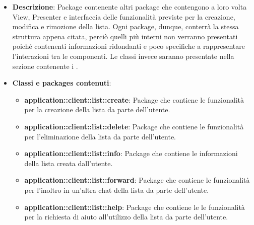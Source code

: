 \begin{itemize}
\item \textbf{Descrizione}: Package contenente altri package che contengono a loro volta View, Presenter e interfaccia delle funzionalità previste per la creazione, modifica e rimozione della lista. Ogni package, dunque, conterrà la stessa struttura appena citata, perciò quelli più interni non verranno presentati poiché contenenti informazioni ridondanti e poco specifiche a rappresentare l'interazioni tra le componenti. Le classi invece saranno presentate nella sezione contenente i .
	\item \textbf{Classi e packages contenuti}:
	\begin{itemize}
	\item \textbf{application::client::list::create}: Package che contiene le funzionalità per la creazione della lista da parte dell'utente.
	\item \textbf{application::client::list::delete}: Package che contiene le funzionalità per l'eliminazione della lista da parte dell'utente.
	\item \textbf{application::client::list::info}: Package che contiene le informazioni della lista creata dall'utente.
	\item \textbf{application::client::list::forward}: Package che contiene le funzionalità per l'inoltro in un'altra chat della lista da parte dell'utente.
	\item \textbf{application::client::list::help}: Package che contiene le le funzionalità per la richiesta di aiuto all'utilizzo della lista da parte dell'utente.
	\end{itemize}
\end{itemize}

